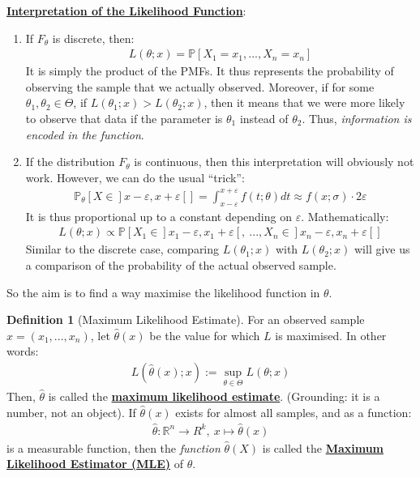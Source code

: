 \documentclass[11pt]{scrartcl}
\newcommand{\R}[0]{\mathbb{R}}
\theoremstyle{definition}
\newtheorem{definition}{Definition}
\theoremstyle{remark}
\newcommand{\dfn}[1]{\textbf{\underline{#1}}}
\newcommand{\pr}[1]{\mathbb{P}[#1]}
\newcommand{\idx}[2]{\int_{#1}^{#2}}
\begin{document}
{\dfn{Interpretation of the Likelihood Function}: 
\begin{enumerate}[noitemsep]
	\item If $F_\theta$ is discrete, then: 
	\begin{align*}
		L(\theta; x) = \pr{X_1 = x_1, ..., X_n = x_n}	
	\end{align*}
	It is simply the product of the PMFs. It thus represents the probability of observing the sample that we actually observed. Moreover, if for some $\theta_1, \theta_2 \in \Theta$, if $L(\theta_1; x) > L(\theta_2; x)$, then it means that we were more likely to observe that data if the parameter is $\theta_1$ instead of $\theta_2$. Thus, \emph{information is encoded in the function}. 
	\item If the distribution $F_\theta$ is continuous, then this interpretation will obviously not work. However, we can do the usual ``trick'': 
	\begin{align*}
		\mathbb{P}_\theta [ X \in ]x - \varepsilon, x + \varepsilon [ ]  = \idx{x - \varepsilon}{x + \varepsilon} f (t; \theta) dt \approx f(x; \sigma) \cdot 2 \varepsilon	
	\end{align*}
	It is thus proportional up to a constant depending on $\varepsilon$. Mathematically: 
	\begin{align*}
		L(\theta; x) \propto \pr{X_1 \in ]x_1 - \varepsilon, x_1 + \varepsilon[,\ ..., X_n \in ]x_n - \varepsilon, x_n + \varepsilon [} 	
	\end{align*}
	Similar to the discrete case, comparing $L(\theta_1; x)$ with $L(\theta_2; x)$ will give us a comparison of the probability of the actual observed sample. 
\end{enumerate}
So the aim is to find a way maximise the likelihood function in $\theta$. 

\begin{definition}[Maximum Likelihood Estimate] 
	For an observed sample $x = (x_1, ..., x_n)$, let $\hat{\theta}(x)$ be the value for which $L$ is maximised. In other words: 
	\begin{align}
		L(\hat{\theta}(x); x) := \sup_{\theta \in \Theta} L(\theta; x) 
	\end{align}
	Then, $\hat{\theta}$ is called the \dfn{maximum likelihood estimate}. (Grounding: it is a number, not an object). If $\hat{\theta}(x)$ exists for almost all samples, and as a function: 
	\begin{align*}
		\hat{\theta}: \R^n \rightarrow R^k,\ x \mapsto \hat{\theta}(x) 	
	\end{align*}
	is a measurable function, then the \emph{function} $\hat{\theta}(X)$ is called the \dfn{Maximum Likelihood Estimator (MLE)} of $\theta$. 
\end{definition}

}
\end{document}
